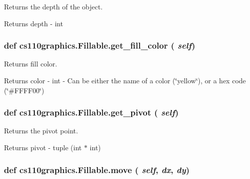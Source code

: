 Returns the depth of the object. \begin{DoxyReturn}{Returns}
depth -\/ int 
\end{DoxyReturn}
\hypertarget{classcs110graphics_1_1Fillable_a16c045bc9b63961b696914ee1a1d14d9}{
\subsubsection[{get\_\-fill\_\-color}]{\setlength{\rightskip}{0pt plus 5cm}def cs110graphics.Fillable.get\_\-fill\_\-color ( {\em self})}}
\label{classcs110graphics_1_1Fillable_a16c045bc9b63961b696914ee1a1d14d9}


Returns fill color. \begin{DoxyReturn}{Returns}
color -\/ int -\/ Can be either the name of a color (\char`\"{}yellow\char`\"{}), or a hex code (\char`\"{}\#FFFF00\char`\"{}) 
\end{DoxyReturn}
\hypertarget{classcs110graphics_1_1Fillable_a514fa0d21297c1372681afae9219fd58}{
\subsubsection[{get\_\-pivot}]{\setlength{\rightskip}{0pt plus 5cm}def cs110graphics.Fillable.get\_\-pivot ( {\em self})}}
\label{classcs110graphics_1_1Fillable_a514fa0d21297c1372681afae9219fd58}


Returns the pivot point. \begin{DoxyReturn}{Returns}
pivot -\/ tuple (int $\ast$ int) 
\end{DoxyReturn}
\hypertarget{classcs110graphics_1_1Fillable_ae8f6c476e29c0810453dc16948e1730c}{
\subsubsection[{move}]{\setlength{\rightskip}{0pt plus 5cm}def cs110graphics.Fillable.move ( {\em self}, \/   {\em dx}, \/   {\em dy})}}
\label{classcs110graphics_1_1Fillable_ae8f6c476e29c0810453dc16948e1730c}


